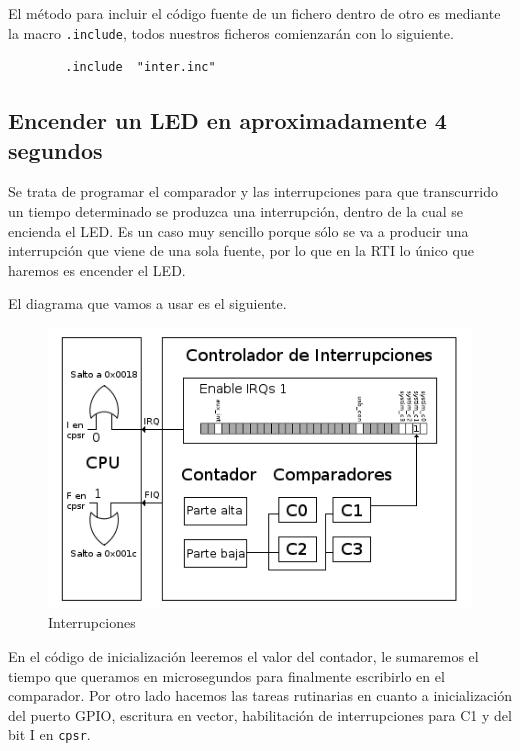 El método para incluir el código fuente de un fichero dentro de otro es mediante
la macro {\tt .include}, todos nuestros ficheros comienzarán con lo siguiente.

\begin{lstlisting}
        .include  "inter.inc"
\end{lstlisting}

\subsection{Encender un LED en aproximadamente 4 segundos}

Se trata de programar el comparador y las interrupciones para que
transcurrido un tiempo determinado se produzca una interrupción, dentro
de la cual se encienda el LED. Es un caso muy sencillo porque sólo
se va a producir una interrupción que viene de una sola fuente, por
lo que en la RTI lo único que haremos es encender el LED.

El diagrama que vamos a usar es el siguiente.

\begin{figure}[h]
  \centering
    \includegraphics[width=14cm]{graphs/inter1.png}
  \caption{Interrupciones}
  \label{fig:inter1}
\end{figure}

En el código de inicialización leeremos el valor del contador, le
sumaremos el tiempo que queramos en microsegundos para finalmente
escribirlo en el comparador. Por otro lado hacemos las tareas
rutinarias en cuanto a inicialización del puerto GPIO, escritura
en vector, habilitación de interrupciones para C1 y del bit I en {\tt cpsr}.

